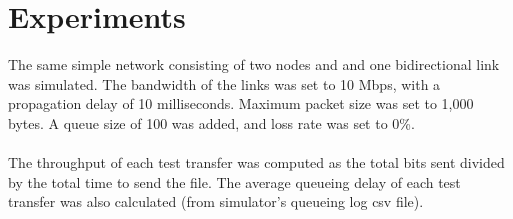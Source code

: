 \documentclass[fleqn,11pt]{article}
\begin{document}
\section{Experiments}

The same simple network consisting of two nodes and and one bidirectional link was simulated. The bandwidth of the links was set to 10 Mbps, with a propagation delay of 10 milliseconds. Maximum packet size was set to 1,000 bytes. A queue size of 100 was added, and loss rate was set to 0\%. \\
 \\
The throughput of each test transfer was computed as the total bits sent divided by the total time to send the file. The average queueing delay of each test transfer was also calculated (from simulator's queueing log csv file).
\end{document}
